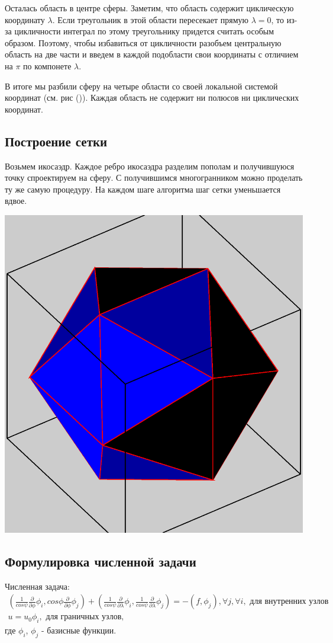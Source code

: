 \documentclass[a4paper,article]{article}
\begin{document}
Осталась область в центре сферы. Заметим, что область содержит
циклическую координату $\lambda$. Если треугольник в этой области
пересекает прямую $\lambda=0$, то из-за цикличности интеграл по этому
треугольнику придется считать особым образом. Поэтому, чтобы
избавиться от цикличности разобъем центральную область на две части и
введем в каждой подобласти свои координаты с отличием на $\pi$ по
компонете $\lambda$.

В итоге мы разбили сферу на четыре области со своей локальной системой
координат (см. рис ()). Каждая область не содержит ни полюсов ни
циклических координат. 

\subsection*{Построение сетки}
Возьмем икосаэдр. Каждое ребро икосаэдра разделим пополам и
получившуюся точку спроектируем на сферу. С получившимся
многогранником можно проделать ту же самую процедуру. На каждом шаге
алгоритма шаг сетки уменьшается вдвое. 

\includegraphics[scale=0.5]{icosahedron.eps}

\subsection*{Формулировка численной задачи}
Численная задача:
\begin{equation*}
\begin{split}
(\frac{1}{cos\psi}\frac{\partial}{\partial \phi} \phi_i, cos\phi
  \frac{\partial}{\partial \phi} \phi_j) 
+(\frac{1}{cos\psi}\frac{\partial}{\partial \lambda}\phi_i,
\frac{1}{cos\psi}\frac{\partial}{\partial \lambda}\phi_j ) = -(f,
\phi_j), \forall j, \forall i, \text{ для внутренних узлов } \\ 
u = u_0 \phi_i, \text { для граничных узлов, }
\end{split}
\end{equation*}
где $\phi_i$, $\phi_j$ - базисные функции.
\end{document}
